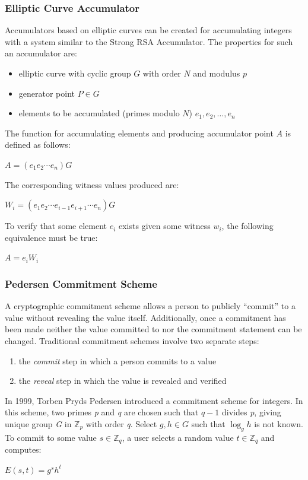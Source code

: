 \documentclass[11pt]{article}
\begin{document}
\subsubsection{Elliptic Curve Accumulator}
Accumulators based on elliptic curves can be created for accumulating integers with a system similar to the Strong RSA
Accumulator. The properties for such an accumulator are:
\begin{itemize}
    \item elliptic curve with cyclic group $G$ with order $N$ and modulus $p$
    \item generator point $P \in G$ 
    \item elements to be accumulated (primes modulo $N$) $e_1, e_2, \ldots, e_n$
\end{itemize}

The function for accumulating elements and producing accumulator point $A$ is defined as follows:
\begin{center}
    $A = (e_1 e_2 \cdots e_n) G$
\end{center}

The corresponding witness values produced are:
\begin{center}
    $W_i = (e_1 e_2 \cdots e_{i-1} e_{i+1} \cdots e_n) G$
\end{center}

To verify that some element $e_i$ exists given some witness $w_i$, the following equivalence must be true:
\begin{center}
    $A = e_i W_i$
\end{center}

\subsubsection{Pedersen Commitment Scheme}
A cryptographic commitment scheme allows a person to publicly ``commit'' to a value without revealing the value itself.
Additionally, once a commitment has been made neither the value committed to nor the commitment statement can be
changed. Traditional commitment schemes involve two separate steps:
\begin{enumerate}
    \item the \emph{commit} step in which a person commits to a value
    \item the \emph{reveal} step in which the value is revealed and verified
\end{enumerate}

In 1999, Torben Pryds Pedersen introduced a commitment scheme for integers.\cite{pedersen} In this scheme, two primes
\emph{p} and \emph{q} are chosen such that $q-1$ divides \emph{p}, giving unique group \emph{G} in $\mathbb{Z}_p$ with
order \emph{q}. Select $g, h \in G$ such that $\log_g h$ is not known. To commit to some value $s \in \mathbb{Z}_q$, a
user selects a random value $t \in \mathbb{Z}_q$ and computes:
\begin{center}
    $E(s,t) = g^sh^t$
\end{center}
\end{document}
